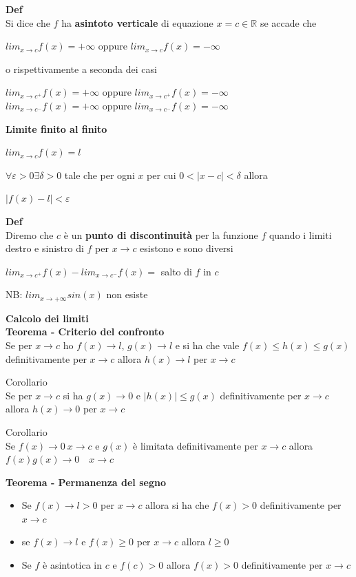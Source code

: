\documentclass[12pt, a4paper]{article}
\begin{document}
    \textbf{Def}\\Si dice che $f$ ha \textbf{asintoto verticale} di equazione $x=c\in\mathbb{R}$ se accade
    che
    \begin{center}
        $lim_{x\to c}f(x)=+\infty$ oppure $lim_{x\to c}f(x)=-\infty$
    \end{center}
    o rispettivamente a seconda dei casi
    \begin{center}
        $lim_{x\to c^{+}}f(x)=+\infty$ oppure $lim_{x\to c^{+}}f(x)=-\infty$\\
        $lim_{x\to c^{-}}f(x)=+\infty$ oppure $lim_{x\to c^{-}}f(x)=-\infty$
    \end{center}

    \textbf{Limite finito al finito}
    \begin{center}
        $lim_{x\to c}f(x)=l$
    \end{center}
$\forall\varepsilon>0 \exists\delta>0$ tale che per ogni $x$ per cui $0<|x-c|<\delta$ allora
    \begin{center}
        $|f(x)-l|<\varepsilon$
    \end{center}

    \textbf{Def}\\Diremo che $c$ è un \textbf{punto di discontinuità} per la funzione $f$ quando i limiti
    destro e sinistro di $f$ per $x\to c$ esistono e sono diversi
    \begin{center}
        $lim_{x\to c^{+}}f(x)-lim_{x\to c^{-}}f(x)=$ salto di $f$ in $c$
    \end{center}

    NB: $lim_{x\to+\infty}sin(x)$ non esiste

    \textbf{Calcolo dei limiti}\\\textbf{Teorema - Criterio del confronto}\\ Se per $x\to c$ ho $f(x)\to l$, $g(x)\to l$
    e si ha che vale $f(x)\leq h(x)\leq g(x)$ definitivamente per $x\to c$ allora $h(x)\to l$ per $x\to c$

    Corollario\\Se per $x\to c$ si ha $g(x)\to 0$ e $|h(x)|\leq g(x)$ definitivamente per $x\to c$ allora $h(x)\to 0$
    per $x\to c$

    Corollario\\Se $f(x)\to 0\ x\to c$ e $g(x)$ è limitata definitivamente per $x\to c$ allora $f(x)g(x)\to 0\quad
x\to c$

    \textbf{Teorema - Permanenza del segno}
    \begin{itemize}
        \item Se $f(x)\to l>0$ per $x\to c$ allora si ha che $f(x)>0$ definitivamente per $x\to c$
        \item se $f(x)\to l$ e $f(x)\geq 0$ per $x\to c$ allora $l\geq 0$
        \item Se $f$ è asintotica in $c$ e $f(c)>0$ allora $f(x)>0$ definitivamente per $x\to c$
    \end{itemize}
\end{document}

